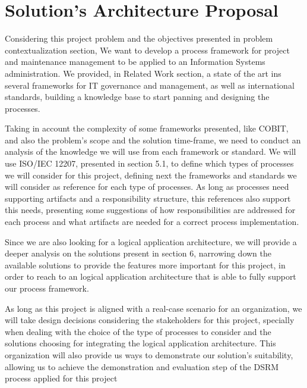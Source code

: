 
% 
% 

\section{Solution's Architecture Proposal}

Considering this project problem and the objectives presented in problem contextualization section, We want to develop a process framework for project and maintenance management to be applied to an Information Systems administration. We provided, in Related Work section, a state of the art ins several frameworks for IT governance and management, as well as international standards, building a knowledge base to start panning and designing the processes.\par
Taking in account the complexity of some frameworks presented, like COBIT, and also the problem's scope and the solution time-frame, we need to conduct an analysis of the knowledge we will use from each framework or standard. We will use ISO/IEC 12207, presented in section 5.1, to define which types of processes we will consider for this project, defining next the frameworks and standards we will consider as reference for each type of processes. As long as processes need supporting artifacts and a responsibility structure, this references also support this needs, presenting some suggestions of how responsibilities are addressed for each process and what artifacts are needed for a correct process implementation.\par
Since we are also looking for a logical application architecture, we will provide a deeper analysis on the solutions present in section 6, narrowing down the available solutions to provide the features more important for this project, in order to reach to an logical application architecture that is able to fully support our process framework.\par
As long as this project is aligned with a real-case scenario for an organization, we will take design decisions considering the stakeholders for this project, specially when dealing with the choice of the type of processes to consider and the solutions choosing for integrating the logical application architecture. This organization will also provide us ways to demonstrate our solution's suitability, allowing us to achieve the demonstration and evaluation step of the DSRM process applied for this project\par



